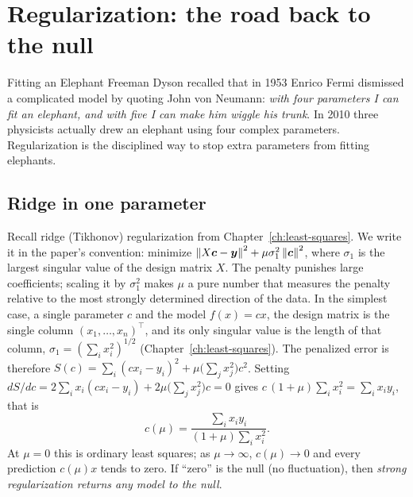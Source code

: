 \section{Regularization: the road back to the null}\label{sec:generalization-ridge}
\begin{didyouknow}{Fitting an Elephant}
Freeman Dyson recalled that in 1953 Enrico Fermi dismissed a complicated model by quoting John von Neumann: \emph{with four parameters I can fit an elephant, and with five I can make him wiggle his trunk}. In 2010 three physicists actually drew an elephant using four complex parameters. Regularization is the disciplined way to stop extra parameters from fitting elephants.
\end{didyouknow}

\subsection{Ridge in one parameter}

Recall ridge (Tikhonov) regularization from Chapter~\ref{ch:least-squares}. We write it in the paper's convention: minimize $\left\lVert X\bm c-\bm y\right\rVert^2+\mu\sigma_1^2\left\lVert \bm c\right\rVert^2$, where $\sigma_1$ is the largest singular value of the design matrix $X$. The penalty punishes large coefficients; scaling it by $\sigma_1^2$ makes $\mu$ a pure number that measures the penalty relative to the most strongly determined direction of the data. In the simplest case, a single parameter $c$ and the model $f(x)=cx$, the design matrix is the single column $(x_1,\dots,x_n)^\top$, and its only singular value is the length of that column, $\sigma_1=(\sum_ix_i^2)^{1/2}$ (Chapter~\ref{ch:least-squares}). The penalized error is therefore $S(c)=\sum_i(cx_i-y_i)^2+\mu\bigl(\sum_jx_j^2\bigr)c^2$. Setting $dS/dc=2\sum_ix_i(cx_i-y_i)+2\mu\bigl(\sum_jx_j^2\bigr)c=0$ gives $c\,(1+\mu)\sum_ix_i^2=\sum_ix_iy_i$, that is
\begin{equation}
c(\mu)=\frac{\sum_ix_iy_i}{(1+\mu)\sum_ix_i^2}.
\label{eq:generalization-ridge1}
\end{equation}
At $\mu=0$ this is ordinary least squares; as $\mu\to\infty$, $c(\mu)\to0$ and every prediction $c(\mu)x$ tends to zero. If ``zero'' is the null (no fluctuation), then \emph{strong regularization returns any model to the null}.

